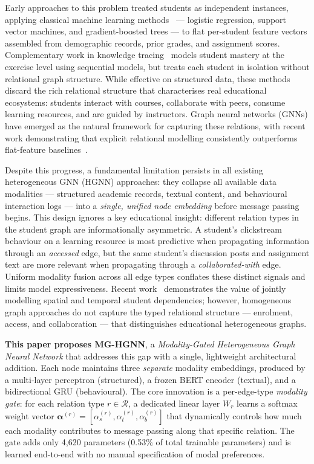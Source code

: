 \documentclass[sigconf,review]{acmart}
\begin{document}
Early approaches to this problem treated students as
independent instances, applying classical machine
learning methods~\citep{kotsiantis2012use,
delen2011predicting} --- logistic regression, support
vector machines, and gradient-boosted trees --- to flat
per-student feature vectors assembled from demographic
records, prior grades, and assignment scores.
Complementary work in knowledge
tracing~\citep{piech2015deep, ghosh2020context,
pandey2019self} models student mastery at the
exercise level using sequential models, but treats
each student in isolation without relational graph
structure. While effective on structured data,
these methods discard the
rich relational structure that characterises real
educational ecosystems: students interact with courses,
collaborate with peers, consume learning resources, and
are guided by instructors. Graph neural networks (GNNs)
have emerged as the natural framework for capturing
these relations, with recent work demonstrating that
explicit relational modelling consistently outperforms
flat-feature baselines~\citep{li2022studygnn,
huang2024dual, yang2024hypergraph}.

Despite this progress, a fundamental limitation persists
in all existing heterogeneous GNN (HGNN) approaches: they
collapse all available data modalities --- structured
academic records, textual content, and behavioural
interaction logs --- into a \emph{single, unified node
embedding} before message passing begins. This design
ignores a key educational insight: different relation
types in the student graph are informationally
asymmetric. A student's clickstream behaviour on a
learning resource is most predictive when propagating
information through an \textit{accessed} edge, but the
same student's discussion posts and assignment text are
more relevant when propagating through a
\textit{collaborated-with} edge. Uniform modality fusion
across all edge types conflates these distinct signals
and limits model expressiveness. Recent
work~\citep{yu2026ustga} demonstrates
the value of jointly modelling spatial and
temporal student dependencies; however,
homogeneous graph approaches do not capture
the typed relational structure --- enrolment,
access, and collaboration --- that distinguishes
educational heterogeneous graphs.

\textbf{This paper proposes MG-HGNN}, a
\textit{Modality-Gated Heterogeneous Graph Neural
Network} that addresses this gap with a single,
lightweight architectural addition. Each node maintains
three \emph{separate} modality embeddings, produced by
a multi-layer perceptron (structured), a frozen BERT
encoder (textual), and a bidirectional GRU (behavioural).
The core innovation is a per-edge-type \emph{modality
gate}: for each relation type $r \in \mathcal{R}$, a
dedicated linear layer $W_r$ learns a softmax weight
vector $\boldsymbol{\alpha}^{(r)} = [\alpha_s^{(r)},
\alpha_t^{(r)}, \alpha_b^{(r)}]$ that dynamically
controls how much each modality contributes to message
passing along that specific relation. The gate adds only
4,620 parameters (0.53\% of total trainable parameters)
and is learned end-to-end with no manual specification
of modal preferences.
\end{document}
